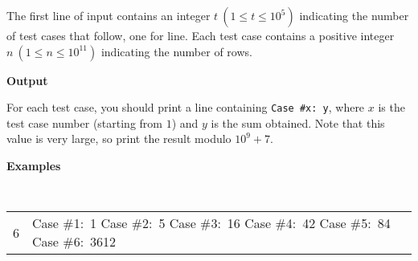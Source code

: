 \documentclass{article}
\newenvironment{EnglishTestCases}
{
	\vspace{-4mm}
	\begingroup
	\tt
	\renewcommand{\arraystretch}{1.5} %
	\begin{longtable}{| p{85mm} | p{85mm} |}
		\hline
		{\sf {\bfseries Input}} & {\sf {\bfseries Output}} \\ \hline
		\endfirsthead
}
{
	\end{longtable}
	\endgroup
}
\newcommand{\printSubtitle}[1]{
	\vspace{1mm}
	\begin{flushleft} {\Large \sf \bfseries #1 \newline} \end{flushleft}
	\vspace{-4mm}
}
\newcommand{\addTest}[2]{
	#1 %
	&
	#2 %
	\\
	\hline
}
\begin{document}
The first line of input contains an integer $ t ~ (1 \le t \le 10^{5}) $ indicating the number of test cases that
follow, one for line. Each test case contains a positive integer $ n ~ (1 \le n \le 10^{11}) $ indicating the number of
rows.
\newline




\printSubtitle{Output}

For each test case, you should print a line containing {\tt Case \#x:\ y}, where $ x $ is the test case number (starting
from $ 1 $) and $ y $ is the sum obtained. Note that this value is very large, so print the result modulo
$ 10^{9} + 7 $.
\newline




\printSubtitle{Examples}

\begin{EnglishTestCases}
	\addTest{
		6 \newline
		1 \newline
		2 \newline
		3 \newline
		4 \newline
		5 \newline
		14
	}
	{
		Case \#1:\ 1 \newline
		Case \#2:\ 5 \newline
		Case \#3:\ 16 \newline
		Case \#4:\ 42 \newline
		Case \#5:\ 84 \newline
		Case \#6:\ 3612
	}
\end{EnglishTestCases}
\end{document}
